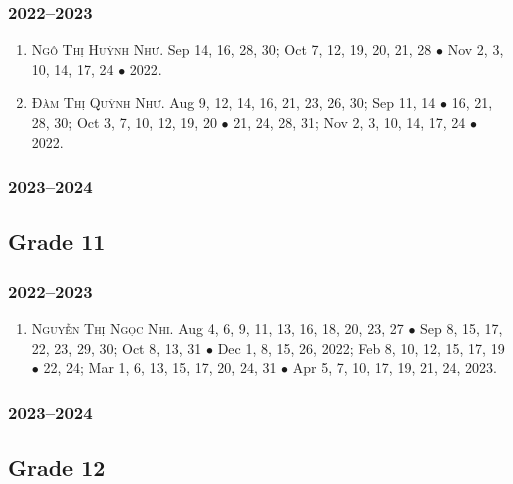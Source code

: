 \documentclass{article}
\begin{document}
\subsubsection{2022--2023}

\begin{enumerate}
	\item \textsc{Ngô Thị Huỳnh Như.} {\sf[In]} Sep 14, 16, 28, 30; Oct 7, 12, 19, 20, 21, 28 $\bullet$ Nov 2, 3, 10, 14, 17, 24 $\bullet$ 2022. {\sf[Out]}
	\item \textsc{Đàm Thị Quỳnh Như.} {\sf[In]} Aug 9, 12, 14, 16, 21, 23, 26, 30; Sep 11, 14 $\bullet$ 16, 21, 28, 30; Oct 3, 7, 10, 12, 19, 20 $\bullet$ 21, 24, 28, 31; Nov 2, 3, 10, 14, 17, 24 $\bullet$ 2022. {\sf[Out]}
\end{enumerate}

\subsubsection{2023--2024}


\subsection{Grade 11}

\subsubsection{2022--2023}

\begin{enumerate}
	\item \textsc{Nguyễn Thị Ngọc Nhi.} {\sf[In]} Aug 4, 6, 9, 11, 13, 16, 18, 20, 23, 27 $\bullet$ Sep 8, 15, 17, 22, 23, 29, 30; Oct 8, 13, 31 $\bullet$ Dec 1, 8,  15, 26, 2022; Feb 8, 10, 12, 15, 17, 19 $\bullet$ 22, 24; Mar 1, 6, 13, 15, 17, 20, 24, 31 $\bullet$ Apr 5, 7, 10, 17, 19, 21, 24, 2023. {\sf[Out]}
\end{enumerate}

\subsubsection{2023--2024}


\subsection{Grade 12}
\end{document}
